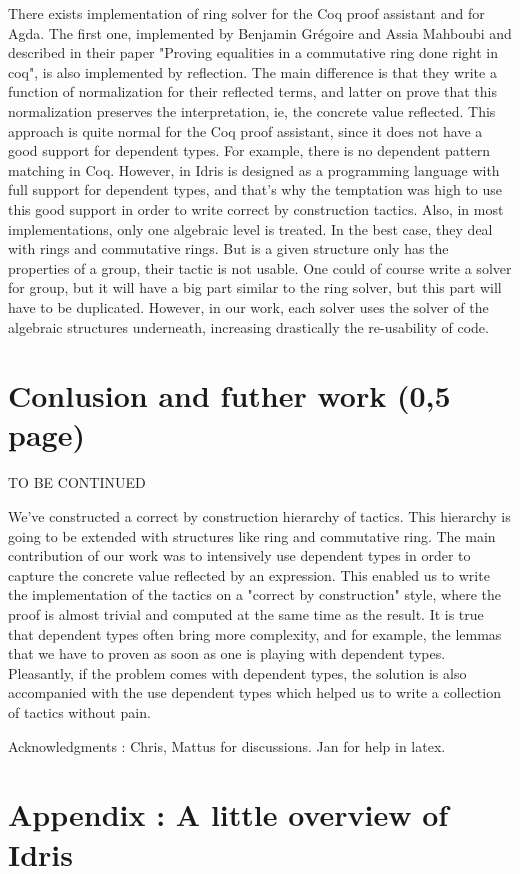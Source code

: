 \documentclass{sigplanconf}
\begin{document}
There exists implementation of ring solver for the Coq proof assistant and for Agda. The first one, implemented by Benjamin Grégoire and Assia Mahboubi and described in their paper "Proving equalities in a commutative ring done right in coq", is also implemented by reflection.
The main difference is that they write a function of normalization for their reflected terms, and latter on prove that this normalization preserves the interpretation, ie, the concrete value reflected.
This approach is quite normal for the Coq proof assistant, since it does not have a good support for dependent types. For example, there is no dependent pattern matching in Coq. However, in Idris is designed as a programming language with full support for dependent types, and that's why the temptation was high to use this good support in order to write correct by construction tactics.
Also, in most implementations, only one algebraic level is treated. In the best case, they deal with rings and commutative rings. But is a given structure only has the properties of a group, their tactic is not usable. One could of course write a solver for group, but it will have a big part similar to the ring solver, but this part will have to be duplicated.
However, in our work, each solver uses the solver of the algebraic structures underneath, increasing drastically the re-usability of code.

\section {Conlusion and futher work (0,5 page)}
TO BE CONTINUED

We've constructed a correct by construction hierarchy of tactics. This hierarchy is going to be extended  with structures like ring and commutative ring. The main contribution of our work was to intensively use dependent types in order to capture the concrete value reflected by an expression. This enabled us to write the implementation of the tactics on a "correct by construction" style, where the proof is almost trivial and computed at the same time as the result.
It is true that dependent types often bring more complexity, and for example, the lemmas that we have to proven as soon as one is playing with dependent types. Pleasantly, if the problem comes with dependent types, the solution is also accompanied with the use dependent types which helped us to write a collection of tactics without pain.


\acks

Acknowledgments : Chris, Mattus for discussions. Jan for help in latex.




\appendix
\section{Appendix : A little overview of Idris}


\end{document}
